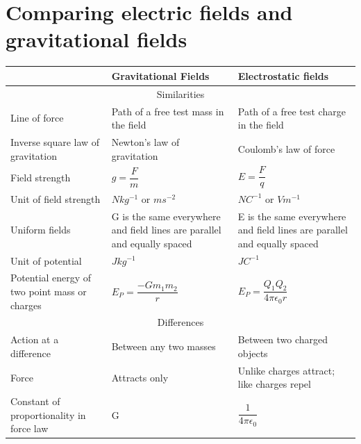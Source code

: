 \documentclass{article}[18pt]
\begin{document}
\section{Comparing electric fields and gravitational fields}
\begin{tabular}{ |p{5.5cm}|p{5.5cm}|p{5.5cm}|  }
\hline
&Gravitational Fields&Electrostatic fields\\
 \hline
 \multicolumn{3}{|c|}{Similarities} \\
 \hline
 Line of force&Path of a free test mass in the field & Path of a free test charge in the field\\
 \hline
 Inverse square law of gravitation & Newton's law of gravitation & Coulomb's law of force\\
 \hline
 Field strength & $g=\dfrac{F}{m}$ & $E=\dfrac{F}{q}$\\
 \hline
 Unit of field strength & $Nkg^{-1}$ or $ms^{-2}$ & $NC^{-1}$ or $Vm^{-1}$\\
 \hline
 Uniform fields & G is the same everywhere and field lines are parallel and equally spaced & E is the same everywhere and field lines are parallel and equally spaced \\
 \hline
 Unit of potential & $Jkg^{-1}$ & $JC^{-1}$ \\
 \hline
 Potential energy of two point mass or charges & $E_P=\dfrac{-Gm_1m_2}{r}$ & $E_P=\dfrac{Q_1Q_2}{4\pi\epsilon_0r}$\\
 \hline
 \multicolumn{3}{|c|}{Differences} \\
 \hline
 Action at a difference & Between any two masses & Between two charged objects \\
 \hline
 Force & Attracts only & Unlike charges attract; like charges repel \\
 \hline
 Constant of proportionality in force law & G & $\dfrac{1}{4\pi\epsilon_0}$ \\
 \hline
 
 
\end{tabular}
\end{document}
